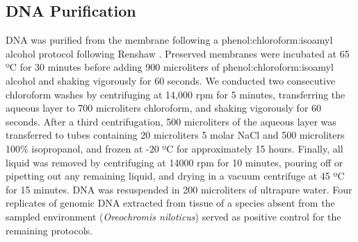 \documentclass[11pt,letterpaper]{article} %
\begin{document}
\subsection*{DNA Purification}
DNA was purified from the membrane following a phenol:chloroform:isoamyl alcohol protocol following Renshaw \citep{Renshaw2015}. Preserved membranes were incubated at 65 ºC for 30 minutes before adding 900 microliters of phenol:chloroform:isoamyl alcohol and shaking vigorously for 60 seconds. We conducted two consecutive chloroform washes by centrifuging at 14,000 rpm for 5 minutes, transferring the aqueous layer to 700 microliters chloroform, and shaking vigorously for 60 seconds. After a third centrifugation, 500 microliters of the aqueous layer was transferred to tubes containing 20 microliters 5 molar NaCl and 500 microliters 100\% isopropanol, and frozen at -20 ºC for approximately 15 hours. Finally, all liquid was removed by centrifuging at 14000 rpm for 10 minutes, pouring off or pipetting out any remaining liquid, and drying in a vacuum centrifuge at 45 ºC for 15 minutes. DNA was resuspended in 200 microliters of ultrapure water. Four replicates of genomic DNA extracted from tissue of a species absent from the sampled environment (\textit{Oreochromis niloticus}) served as positive control for the remaining protocols.
\end{document}
